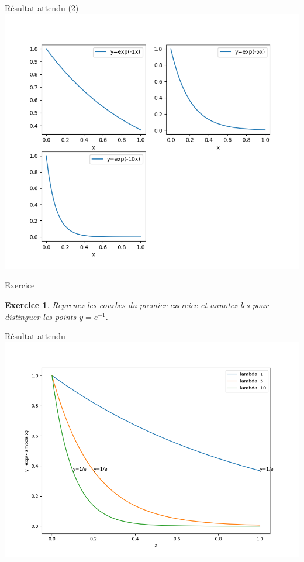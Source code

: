 \documentclass[11pt]{beamer}
\newtheorem{exercice}{Exercice}
\begin{document}
\begin{frame}{Résultat attendu (2)}
\includegraphics[scale=0.45]{ex202}
\end{frame}


\begin{frame}{Exercice}
\begin{exercice}
Reprenez les courbes du premier exercice et annotez-les pour distinguer les points $y=e^{-1}$.
\end{exercice}
\end{frame}

\begin{frame}{Résultat attendu}
\includegraphics[scale=0.45]{ex203}
\end{frame}
\end{document}
